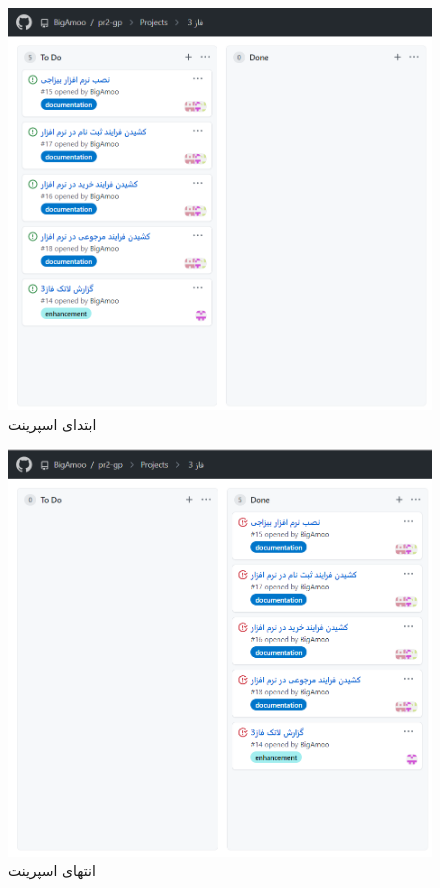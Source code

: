 \documentclass[12pt,a4paper]{article}
\begin{document}
	\begin{figure}[h!]
	\begin{center}
		\includegraphics[width=14cm]{images/screenshot_7.png}	
	\end{center}
	\caption{ابتدای اسپرینت}
\end{figure}

\begin{figure}[h!]
	\begin{center}
		\includegraphics[width=14cm]{images/screenshot_1.png}
	\end{center}
	\caption{انتهای اسپرینت}
\end{figure}


		
\end{document}
